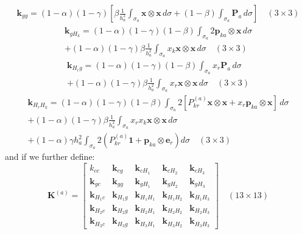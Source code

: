 \documentclass[11pt]{article} %
\begin{document}
\begin{eqnarray}
	\mathbf{k}_{gg} = (1-\alpha) (1-\gamma) \left[ \beta \frac{1}{h_a^2} \int_{\sigma_a} \mathbf{x} \otimes \mathbf{x} \, d \sigma + (1-\beta) \int_{\sigma_a} \mathbf{P}_a \, d \sigma \right] \quad (3 \times 3)
\end{eqnarray}
\begin{eqnarray}
	\mathbf{k}_{gH_k} = (1-\alpha)(1-\gamma)(1-\beta) \int_{\sigma_a} 2 \mathbf{p}_{ka} \otimes \mathbf{x} \, d \sigma \nonumber \\ + (1-\alpha) (1-\gamma) \beta \frac{1}{h_a^2} \int_{\sigma_a} x_k \mathbf{x} \otimes \mathbf{x} \, d \sigma \quad (3 \times 3)
\end{eqnarray}
\begin{eqnarray}
	\mathbf{k}_{H_rg} = (1-\alpha)(1-\gamma)(1-\beta) \int_{\sigma_a} x_r \mathbf{P}_a \, d \sigma \nonumber \\ + (1-\alpha) (1-\gamma) \beta \frac{1}{h_a^2} \int_{\sigma_a} x_r \mathbf{x} \otimes \mathbf{x} \, d \sigma \quad (3 \times 3)
\end{eqnarray}
\begin{eqnarray}
	\mathbf{k}_{H_rH_k} = (1-\alpha)(1-\gamma)(1-\beta) \int_{\sigma_a} 2 \left[ P^{(a)}_{kr} \mathbf{x} \otimes \mathbf{x} + x_r \mathbf{p}_{ka} \otimes \mathbf{x} \right] \, d \sigma \nonumber \\ + (1-\alpha) (1-\gamma) \beta \frac{1}{h_a^2} \int_{\sigma_a} x_r x_k \mathbf{x} \otimes \mathbf{x} \, d \sigma \nonumber \\ + (1-\alpha) \gamma h_a^2 \int_{\sigma_a} 2 (P^{(a)}_{kr} \mathbf{1} + \mathbf{p}_{ka} \otimes \mathbf{e}_r) d \sigma \quad (3 \times 3) \quad
\end{eqnarray}
and if we further define:
\begin{equation}
	\mathbf{K}^{(a)} = \left[ \begin{array}{ccccc} k_{cc} & \mathbf{k}_{cg} & \mathbf{k}_{cH_1} & \mathbf{k}_{cH_2} & \mathbf{k}_{cH_3} \\ \mathbf{k}_{gc} & \mathbf{k}_{gg} & \mathbf{k}_{gH_1} & \mathbf{k}_{gH_2} & \mathbf{k}_{gH_3} \\ \mathbf{k}_{H_1c} & \mathbf{k}_{H_1g} & \mathbf{k}_{H_1H_1} & \mathbf{k}_{H_1H_2} & \mathbf{k}_{H_1H_3} \\ \mathbf{k}_{H_2c} & \mathbf{k}_{H_2g} & \mathbf{k}_{H_2H_1} & \mathbf{k}_{H_2H_2} & \mathbf{k}_{H_2H_3} \\ \mathbf{k}_{H_3c} & \mathbf{k}_{H_3g} & \mathbf{k}_{H_3H_1} & \mathbf{k}_{H_3H_2} & \mathbf{k}_{H_3H_3} \end{array} \right] \quad (13 \times 13)
\end{equation}
\end{document}
